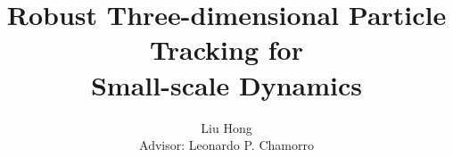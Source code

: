 \documentclass[draftthesis,fullpage]{uiucthesis}
\begin{document}
\title{Robust Three-dimensional Particle Tracking for\\ Small-scale Dynamics}
\author{Liu Hong\\[1cm]{\small Advisor: Leonardo P. Chamorro}}
\phdthesis
{}

\maketitle

\frontmatter








\tableofcontents
\end{document}
